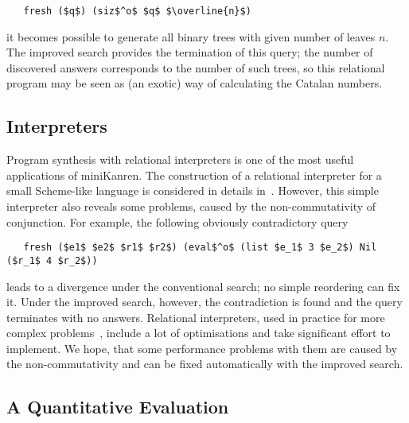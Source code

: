 \begin{lstlisting}
   fresh ($q$) (siz$^o$ $q$ $\overline{n}$)
\end{lstlisting}

\noindent it becomes possible to generate all binary trees with given number of leaves $n$. 
The improved search provides the termination of this query; the number of discovered 
answers corresponds to the number of such trees, so this relational program may be seen 
as (an exotic) way of calculating the Catalan numbers.

\subsection{Interpreters}

Program synthesis with relational interpreters is one of the most useful applications of miniKanren. 
The construction of a relational interpreter for a small Scheme-like language is considered 
in details in~\cite{Untagged}. However, this simple interpreter also reveals some problems, caused by 
the non-commutativity of conjunction. For example, the following obviously contradictory query

\begin{lstlisting}
   fresh ($e1$ $e2$ $r1$ $r2$) (eval$^o$ (list $e_1$ 3 $e_2$) Nil ($r_1$ 4 $r_2$))
\end{lstlisting}

\noindent leads to a divergence under the conventional search; no simple reordering can fix it. 
Under the improved search, however, the contradiction is found and the query terminates with
no answers. Relational interpreters, used in practice for more complex problems~\cite{unified}, 
include a lot of optimisations and take significant effort to implement. We hope, that some 
performance problems with them are caused by the non-commutativity and can be fixed automatically 
with the improved search.

\subsection{A Quantitative Evaluation}

